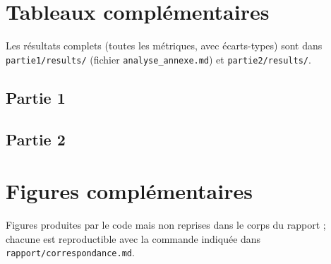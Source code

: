 \documentclass[11pt,a4paper]{article}
\begin{document}
\section{Tableaux complémentaires}
Les résultats complets (toutes les métriques, avec écarts-types) sont dans \texttt{partie1/results/} (fichier \texttt{analyse\_annexe.md}) et \texttt{partie2/results/}.
\subsection*{Partie 1}















\subsection*{Partie 2}



















\clearpage
\section{Figures complémentaires}
Figures produites par le code mais non reprises dans le corps du rapport ; chacune est reproductible avec la commande indiquée dans \texttt{rapport/correspondance.md}.
\end{document}
